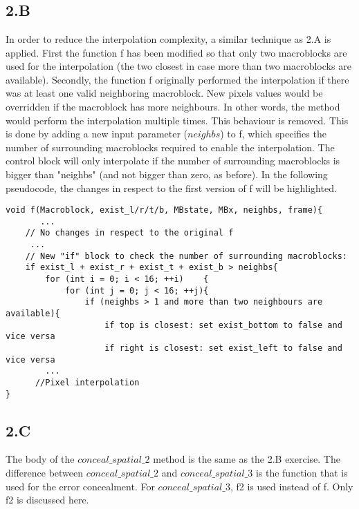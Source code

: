 \section[Pseudocode and explanatory notes for the methods that have been implemented in
Exercises 2.B, 2.C, 3.B, 3.C, and 3D, paying particular attention to the way edge
information and content-adaptivity were leveraged.]{}\label{Q1}

\subsection{2.B}
In order to reduce the interpolation complexity, a similar technique as 2.A is applied. First the function f has been modified so that only two macroblocks are used for the interpolation (the two closest in case more than two macroblocks are available). Secondly, the function f originally performed the interpolation if there was at least one valid neighboring macroblock. New pixels values would be overridden if the macroblock has more neighbours. In other words, the method would perform the interpolation multiple times. This behaviour is removed. This is done by adding a new input parameter ($neighbs$) to f, which specifies the number of surrounding macroblocks required to enable the interpolation. The control block will only interpolate if the number of surrounding macroblocks is bigger than "neighbs" (and not bigger than zero, as before). In the following pseudocode, the changes in respect to the first version of f will be highlighted.
\vspace{1em}
\begin{lstlisting}[frame=single]
void f(Macroblock, exist_l/r/t/b, MBstate, MBx, neighbs, frame){
	   ...
	// No changes in respect to the original f
     ...
	// New "if" block to check the number of surrounding macroblocks:
	if exist_l + exist_r + exist_t + exist_b > neighbs{
		for (int i = 0; i < 16; ++i)	{
			for (int j = 0; j < 16; ++j){
				if (neighbs > 1 and more than two neighbours are available){
                	if top is closest: set exist_bottom to false and vice versa
                    if right is closest: set exist_left to false and vice versa
		...
      //Pixel interpolation
}
\end{lstlisting}

\subsection{2.C}
The body of the $conceal\_spatial\_2$ method is the same as the 2.B exercise. The difference between $conceal\_spatial\_2$ and $conceal\_spatial\_3$ is the function that is used for the error concealment. For $conceal\_spatial\_3$, f2 is used instead of f. Only f2 is discussed here.

